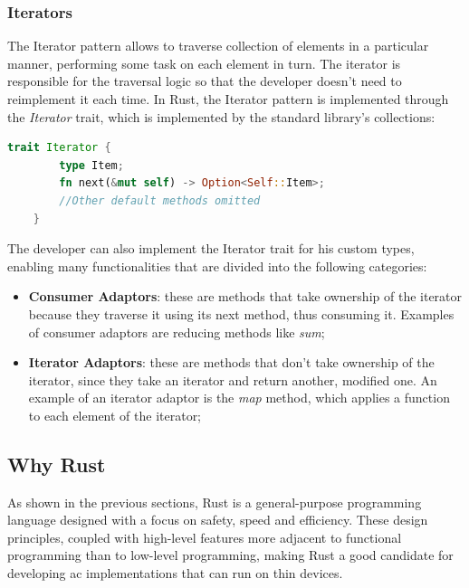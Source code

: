 

\subsubsection{Iterators}
The Iterator pattern allows to traverse collection of elements in a particular manner, performing some task on each element in turn. The iterator is responsible for the traversal logic
so that the developer doesn't need to reimplement it each time. In Rust, the Iterator pattern is implemented through the \textit{Iterator} trait, which is implemented by the standard library's collections:

\begin{lstlisting}[language=Rust]
    trait Iterator {
        type Item;
        fn next(&mut self) -> Option<Self::Item>;
        //Other default methods omitted
    }
\end{lstlisting}

The developer can also implement the Iterator trait for his custom types, enabling many functionalities that are divided into the following categories:

\begin{itemize}
    \item \textbf{Consumer Adaptors}: these are methods that take ownership of the iterator because they traverse it using its next method, thus consuming it. Examples of consumer adaptors are reducing methods like \textit{sum};
    \item \textbf{Iterator Adaptors}: these are methods that don't take ownership of the iterator, since they take an iterator and return another, modified one. An example of an iterator adaptor is the \textit{map} method, which applies a function to each element of the iterator;
\end{itemize}

\subsection{Why Rust}
As shown in the previous sections, Rust is a general-purpose programming language designed with a focus on safety, speed and efficiency. These design principles, coupled with high-level features
more adjacent to functional programming than to low-level programming, making Rust a good candidate for developing \ac{ac} implementations that can run on thin devices.


